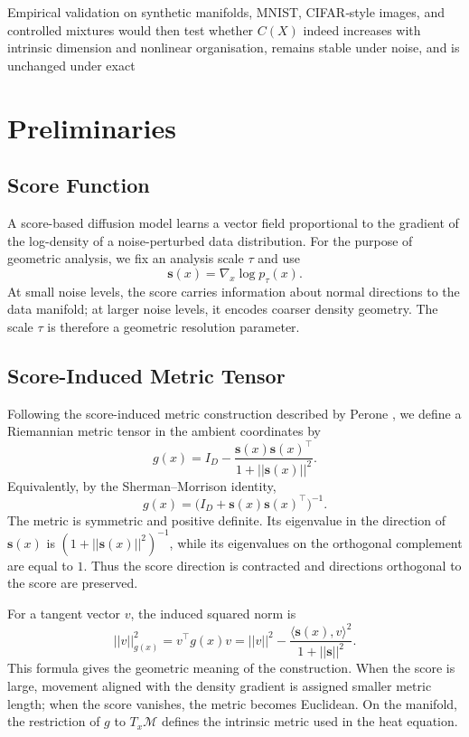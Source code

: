 \documentclass{article}
\newcommand{\M}{\mathcal{M}}
\newcommand{\inner}[2]{\langle #1, #2 \rangle}
\begin{document}
Empirical validation on synthetic manifolds, MNIST, CIFAR‑style images, and controlled mixtures would then test whether \(C(X)\) indeed increases with intrinsic dimension and nonlinear organisation, remains stable under noise, and is unchanged under exact 

\section{Preliminaries}\label{sec:prelim}

\subsection{Score Function}

A score-based diffusion model learns a vector field proportional to the gradient of the log-density of a noise-perturbed data distribution. For the purpose of geometric analysis, we fix an analysis scale \(\tau\) and use
\[
\mathbf{s}(x)=\nabla_x \log p_\tau(x).
\]
At small noise levels, the score carries information about normal directions to the data manifold; at larger noise levels, it encodes coarser density geometry. The scale \(\tau\) is therefore a geometric resolution parameter.

\subsection{Score-Induced Metric Tensor}

Following the score-induced metric construction described by Perone \citep{perone2024scoremetric}, we define a Riemannian metric tensor in the ambient coordinates by
\[
g(x)=I_D-\frac{\mathbf{s}(x)\mathbf{s}(x)^{\top}}{1+||\mathbf{s}(x)||^2}.
\]
Equivalently, by the Sherman--Morrison identity,
\[
g(x)=\bigl(I_D+\mathbf{s}(x)\mathbf{s}(x)^{\top}\bigr)^{-1}.
\]
The metric is symmetric and positive definite. Its eigenvalue in the direction of \(\mathbf{s}(x)\) is \((1+||{\mathbf{s}(x)}||^2)^{-1}\), while its eigenvalues on the orthogonal complement are equal to \(1\). Thus the score direction is contracted and directions orthogonal to the score are preserved.

For a tangent vector \(v\), the induced squared norm is
\[
||v||_{g(x)}^2
=
v^\top g(x)v
=
||v||^2
-
\frac{\inner{\mathbf{s}(x)}{v}^2}{1+||\mathbf{s}||^2}.
\]
This formula gives the geometric meaning of the construction. When the score is large, movement aligned with the density gradient is assigned smaller metric length; when the score vanishes, the metric becomes Euclidean. On the manifold, the restriction of \(g\) to \(T_x\M\) defines the intrinsic metric used in the heat equation.
\end{document}
